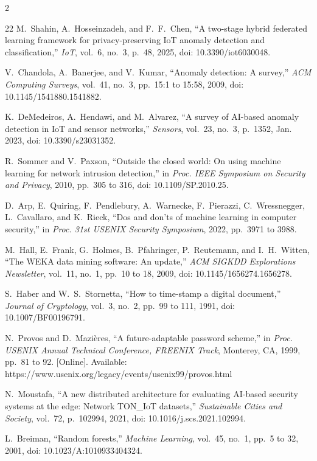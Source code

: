\documentclass[journal,onecolumn]{IEEEtran}
\begin{document}
\begin{multicols}{2}
\begin{thebibliography}{22}
M.~Shahin, A.~Hosseinzadeh, and F.~F.~Chen, ``A two-stage hybrid federated learning framework for privacy-preserving IoT anomaly detection and classification,'' \emph{IoT}, vol.~6, no.~3, p.~48, 2025, doi: 10.3390/iot6030048.

V.~Chandola, A.~Banerjee, and V.~Kumar, ``Anomaly detection: A survey,'' \emph{ACM Computing Surveys}, vol.~41, no.~3, pp.~15:1 to 15:58, 2009, doi: 10.1145/1541880.1541882.

K.~DeMedeiros, A.~Hendawi, and M.~Alvarez, ``A survey of AI-based anomaly detection in IoT and sensor networks,'' \emph{Sensors}, vol.~23, no.~3, p.~1352, Jan. 2023, doi: 10.3390/s23031352.

R.~Sommer and V.~Paxson, ``Outside the closed world: On using machine learning for network intrusion detection,'' in \emph{Proc. IEEE Symposium on Security and Privacy}, 2010, pp.~305 to 316, doi: 10.1109/SP.2010.25.

D.~Arp, E.~Quiring, F.~Pendlebury, A.~Warnecke, F.~Pierazzi, C.~Wressnegger, L.~Cavallaro, and K.~Rieck, ``Dos and don'ts of machine learning in computer security,'' in \emph{Proc. 31st USENIX Security Symposium}, 2022, pp.~3971 to 3988.

M.~Hall, E.~Frank, G.~Holmes, B.~Pfahringer, P.~Reutemann, and I.~H.~Witten, ``The WEKA data mining software: An update,'' \emph{ACM SIGKDD Explorations Newsletter}, vol.~11, no.~1, pp.~10 to 18, 2009, doi: 10.1145/1656274.1656278.

S.~Haber and W.~S.~Stornetta, ``How to time-stamp a digital document,'' \emph{Journal of Cryptology}, vol.~3, no.~2, pp.~99 to 111, 1991, doi: 10.1007/BF00196791.

N.~Provos and D.~Mazi{\`e}res, ``A future-adaptable password scheme,'' in \emph{Proc. USENIX Annual Technical Conference, FREENIX Track}, Monterey, CA, 1999, pp.~81 to 92. [Online]. Available: https://www.usenix.org/legacy/events/usenix99/provos.html

N.~Moustafa, ``A new distributed architecture for evaluating AI-based security systems at the edge: Network TON\_IoT datasets,'' \emph{Sustainable Cities and Society}, vol.~72, p.~102994, 2021, doi: 10.1016/j.scs.2021.102994.

L.~Breiman, ``Random forests,'' \emph{Machine Learning}, vol.~45, no.~1, pp.~5 to 32, 2001, doi: 10.1023/A:1010933404324.


\end{thebibliography}
\end{multicols}
\end{document}
